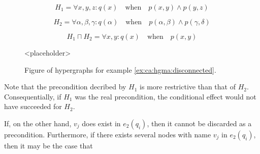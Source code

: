 \documentclass[../Master.tex]{subfiles}
\begin{document}
\begin{example} \label{ex:ca:hgma:disconnected}
    \begin{equation*}
        H_1 = \forall x, y, z : q(x) \quad \text{when} \quad
            p(x,y) \land p(y, z)
    \end{equation*}

    \begin{equation*}
        H_2 = \forall \alpha, \beta, \gamma : q(\alpha) \quad \text{when} \quad
            p(\alpha, \beta) \land p(\gamma, \delta)
    \end{equation*}

    \begin{equation*}
        H_1 \sqcap H_2 = \forall x, y : q(x) \quad \text{when} \quad p(x, y)
    \end{equation*}

    \begin{figure}
        <placeholder>
        \caption{\label{fig:ex:ca:hgma:ex:disconnected} Figure of hypergraphs for example \ref{ex:ca:hgma:disconnected}.}
    \end{figure}

    Note that the precondition decribed by $H_1$ is more restrictive than that of $H_2$. Consequentially, if $H_1$ was the real precondition, the conditional effect would not have succeeded for $H_2$.
\end{example}

If, on the other hand, $v_j$ does exist in $e_2(q_i)$, then it cannot be discarded as a precondition. Furthermore, if there exists several nodes with name $v_j$ in $e_2(q_i)$, then it may be the case that
\end{document}
